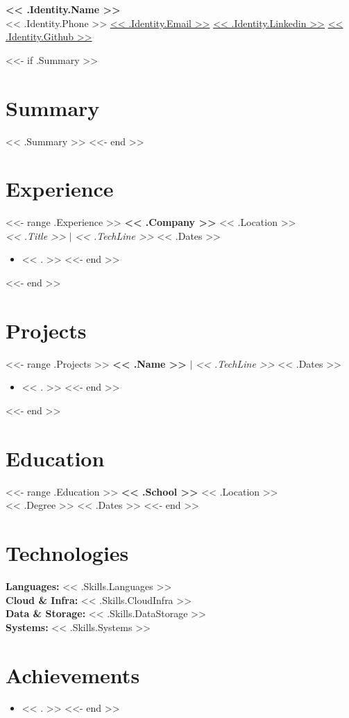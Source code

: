 \documentclass[10.5pt]{article}
\begin{document}
\begin{center}
{\LARGE \textbf{<< .Identity.Name >>}}\\[3pt]
<< .Identity.Phone >> \textbar{} \href{mailto:<< .Identity.Email >>}{<< .Identity.Email >>} \textbar{} \href{https://<< .Identity.Linkedin >>}{<< .Identity.Linkedin >>} \textbar{} \href{https://<< .Identity.Github >>}{<< .Identity.Github >>}
\end{center}

<<- if .Summary >>
\section{Summary}
<< .Summary >>
<<- end >>

\section{Experience}
<<- range .Experience >>
\textbf{<< .Company >>} \hfill << .Location >>\\
\textit{<< .Title >>} $|$ \textit{<< .TechLine >>} \hfill << .Dates >>
\begin{itemize}
<<- range .Bullets >>
  \item << . >>
<<- end >>
\end{itemize}
\vspace{2pt}
<<- end >>

\section{Projects}
<<- range .Projects >>
\textbf{<< .Name >>} $|$ \textit{<< .TechLine >>} \hfill << .Dates >>
\begin{itemize}
<<- range .Bullets >>
  \item << . >>
<<- end >>
\end{itemize}
\vspace{2pt}
<<- end >>

\section{Education}
<<- range .Education >>
\textbf{<< .School >>} \hfill << .Location >>\\
<< .Degree >> \hfill << .Dates >>
<<- end >>

\section{Technologies}
\textbf{Languages:} << .Skills.Languages >>\\
\textbf{Cloud \& Infra:} << .Skills.CloudInfra >>\\
\textbf{Data \& Storage:} << .Skills.DataStorage >>\\
\textbf{Systems:} << .Skills.Systems >>

\section{Achievements}
\begin{itemize}
<<- range .Achievements >>
  \item << . >>
<<- end >>
\end{itemize}
\end{document}
